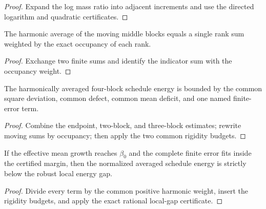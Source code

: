 \begin{proof}
  \leanok
  Expand the log mass ratio into adjacent increments and use the directed
  logarithm and quadratic certificates.
\end{proof}

\begin{lemma}
  \label{lem:middle-block-occupancy}
  \leanok
  The harmonic average of the moving middle blocks equals a single rank sum
  weighted by the exact occupancy of each rank.
\end{lemma}

\begin{proof}
  \leanok
  Exchange two finite sums and identify the indicator sum with the occupancy
  weight.
\end{proof}

\begin{theorem}
  \label{thm:averaged-energy}
  \leanok
  The harmonically averaged four-block schedule energy is bounded by the
  common square deviation, common defect, common mean deficit, and one named
  finite-error term.
\end{theorem}

\begin{proof}
  \leanok
  Combine the endpoint, two-block, and three-block estimates; rewrite moving
  sums by occupancy; then apply the two common rigidity budgets.
\end{proof}

\begin{theorem}
  \label{thm:normalized-local-gap}
  \leanok
  If the effective mean growth reaches $\beta_0$ and the complete finite
  error fits inside the certified margin, then the normalized averaged
  schedule energy is strictly below the robust local energy gap.
\end{theorem}

\begin{proof}
  \leanok
  Divide every term by the common positive harmonic weight, insert the
  rigidity budgets, and apply the exact rational local-gap certificate.
\end{proof}

